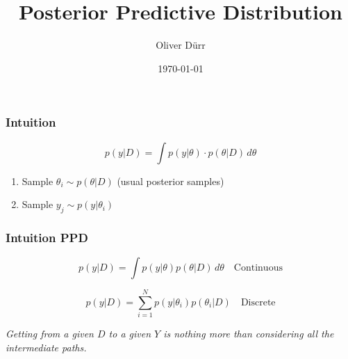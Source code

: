 \documentclass{beamer}
\title{Posterior Predictive Distribution}
\author{Oliver Dürr}
\date{\today}
\begin{document}
 
\frame{\titlepage}

\begin{frame}
\frametitle{Intuition}

\[
p(y|D) = \int p(y|\theta) \cdot p(\theta|D) \, d\theta 
\]

\begin{enumerate}
    \item Sample \( \theta_i \sim p(\theta|D) \) (usual posterior samples)
    \item Sample \( y_j \sim p(y|\theta_i) \)
\end{enumerate}
\end{frame}

\begin{frame}
\frametitle{Intuition PPD}

\[
p(y|D) = \int p(y|\theta) p(\theta|D) \, d\theta \quad \text{Continuous}
\]

\[
p(y|D) = \sum_{i=1}^{N} p(y|\theta_i) p(\theta_i|D) \quad \text{Discrete}
\]


\begin{center}
\end{center}
\begin{center}
\textit{Getting from a given $D$ to a given $Y$ is nothing more than considering all
the intermediate paths.}
\end{center}
\end{frame}
\end{document}
